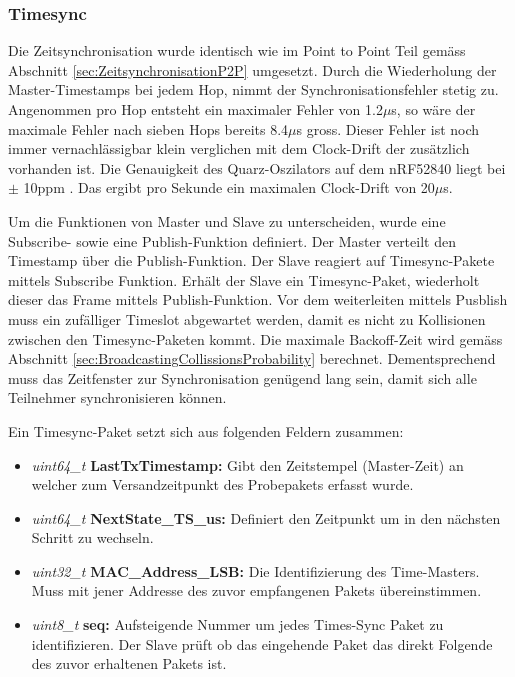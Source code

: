 \subsubsection{Timesync}\label{subsubsec:Timesync}
Die Zeitsynchronisation wurde identisch wie im Point to Point Teil gemäss Abschnitt \ref{sec:ZeitsynchronisationP2P} umgesetzt.
Durch die Wiederholung der Master-Timestamps bei jedem Hop, nimmt der Synchronisationsfehler stetig zu.
Angenommen pro Hop entsteht ein maximaler Fehler von 1.2$\mu$s, so wäre der maximale Fehler nach sieben Hops bereits 8.4$\mu$s gross.
Dieser Fehler ist noch immer vernachlässigbar klein verglichen mit dem Clock-Drift der zusätzlich vorhanden ist.
Die Genauigkeit des Quarz-Oszilators auf dem nRF52840 liegt bei $\pm$ 10ppm \cite{nordic_semiconductor_asa_nrf52840_ps_v11pdf_nodate}.
Das ergibt pro Sekunde ein maximalen Clock-Drift von 20$\mu$s. 

Um die Funktionen von Master und Slave zu unterscheiden, wurde eine Subscribe- sowie eine Publish-Funktion definiert.
Der Master verteilt den Timestamp über die Publish-Funktion.
Der Slave reagiert auf Timesync-Pakete mittels Subscribe Funktion.
Erhält der Slave ein Timesync-Paket, wiederholt dieser das Frame mittels Publish-Funktion.
Vor dem weiterleiten mittels Pusblish muss ein zufälliger Timeslot abgewartet werden, damit es nicht zu Kollisionen zwischen den Timesync-Paketen kommt.
Die maximale Backoff-Zeit wird gemäss Abschnitt \ref{sec:BroadcastingCollissionsProbability} berechnet.
Dementsprechend muss das Zeitfenster zur Synchronisation genügend lang sein, damit sich alle Teilnehmer synchronisieren können.

Ein Timesync-Paket setzt sich aus folgenden Feldern zusammen: 

\begin{itemize}
\item \textit{uint64\_t} \textbf{LastTxTimestamp:}
	Gibt den Zeitstempel (Master-Zeit) an welcher zum Versandzeitpunkt des Probepakets erfasst wurde.
\item \textit{uint64\_t} \textbf{NextState\_TS\_us:}
	Definiert den Zeitpunkt um in den nächsten Schritt zu wechseln.
\item \textit{uint32\_t} \textbf{MAC\_Address\_LSB:}
	Die Identifizierung des Time-Masters. Muss mit jener Addresse des zuvor empfangenen Pakets übereinstimmen.
\item \textit{uint8\_t} \textbf{seq:}
	Aufsteigende Nummer um jedes Times-Sync Paket zu identifizieren. Der Slave prüft ob das eingehende Paket das direkt Folgende des zuvor erhaltenen Pakets ist.
\end{itemize}


